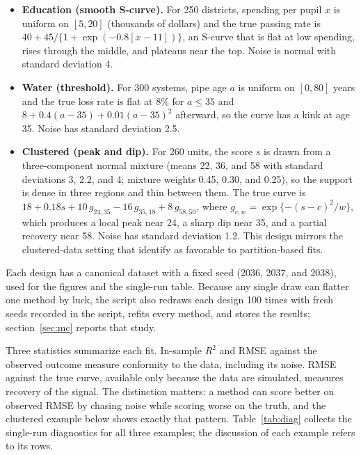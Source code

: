 \begin{itemize}
\item \textbf{Education (smooth S-curve).}  For 250 districts, spending per
pupil $x$ is uniform on $[5, 20]$ (thousands of dollars) and the true passing
rate is $40 + 45/\{1+\exp(-0.8[x-11])\}$, an S-curve that is flat at low
spending, rises through the middle, and plateaus near the top.  Noise is
normal with standard deviation 4.
\item \textbf{Water (threshold).}  For 300 systems, pipe age $a$ is uniform
on $[0, 80]$ years and the true loss rate is flat at 8\% for $a \le 35$ and
$8 + 0.4(a-35) + 0.01(a-35)^2$ afterward, so the curve has a kink at age 35.
Noise has standard deviation 2.5.
\item \textbf{Clustered (peak and dip).}  For 260 units, the score $s$ is
drawn from a three-component normal mixture (means 22, 36, and 58 with
standard deviations 3, 2.2, and 4; mixture weights 0.45, 0.30, and 0.25), so
the support is dense in three regions and thin between them.  The true curve
is $18 + 0.18s + 10\,g_{24,35} - 16\,g_{35,18} + 8\,g_{58,50}$, where
$g_{c,w}=\exp\{-(s-c)^2/w\}$, which produces a local peak near 24, a sharp dip
near 35, and a partial recovery near 58.  Noise has standard deviation 1.2.
This design mirrors the clustered-data setting that
\citet{vinod_viole_2018_clusters} identify as favorable to partition-based
fits.
\end{itemize}

Each design has a canonical dataset with a fixed seed (2036, 2037, and 2038),
used for the figures and the single-run table.  Because any single draw can
flatter one method by luck, the script also redraws each design 100 times
with fresh seeds recorded in the script, refits every method, and stores the
results; section~\ref{sec:mc} reports that study.

Three statistics summarize each fit.  In-sample $R^2$ and RMSE against the
observed outcome measure conformity to the data, including its noise.  RMSE
against the true curve, available only because the data are simulated,
measures recovery of the signal.  The distinction matters: a method can score
better on observed RMSE by chasing noise while scoring worse on the truth,
and the clustered example below shows exactly that pattern.
Table~\ref{tab:diag} collects the single-run diagnostics for all three
examples; the discussion of each example refers to its rows.

